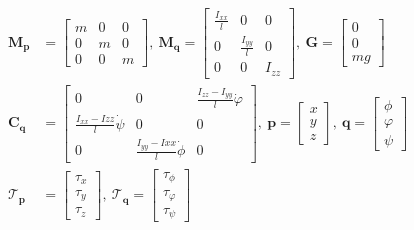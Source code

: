 \begin{align}
    \mathbf{M_p} & = \begin{bmatrix}
        m & 0 & 0 \\
        0 & m & 0 \\
        0 & 0 & m
    \end{bmatrix}, ~
    \mathbf{M_q} = \begin{bmatrix}
        \frac{I_{xx}}{l} & 0 & 0 \\
        0 & \frac{I_{yy}}{l} & 0 \\
        0 & 0 & I_{zz}
    \end{bmatrix}, ~
    \mathbf{G} = \begin{bmatrix}
        0 \\
        0 \\
        mg
    \end{bmatrix}\nonumber \\
    \mathbf{C_q} &= \begin{bmatrix}
        0 & 0 & \frac{I_{zz} - I_{yy}}{l}\dot{\varphi} \\
        \frac{I_{xx} - I{zz}}{l}\dot{\psi} & 0 & 0 \\
        0 & \frac{I_{yy} - I{xx}}{l}\dot{\phi} & 0
    \end{bmatrix}, ~
    \mathbf{p} = \begin{bmatrix}
        x \\
        y \\
        z
    \end{bmatrix}, ~
    \mathbf{q} = \begin{bmatrix}
        \phi \\
        \varphi \\
        \psi
    \end{bmatrix}\nonumber \\
    \mathbf{\mathcal{T}_p} & = \begin{bmatrix}
        \tau_x \\
        \tau_y \\
        \tau_z
    \end{bmatrix}, ~
    \mathbf{\mathcal{T}_q} = \begin{bmatrix}
        \tau_{\phi} \\
        \tau_{\varphi} \\
        \tau_{\psi}
    \end{bmatrix}\nonumber \\
\end{align}

